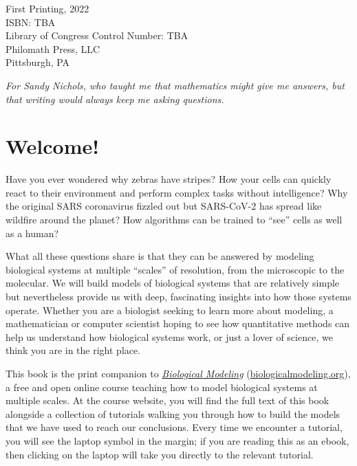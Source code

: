 \noindent First Printing, 2022\\

\noindent ISBN: TBA\\

\noindent Library of Congress Control Number: TBA\\

\noindent Philomath Press, LLC\\
Pittsburgh, PA
\addtocounter{page}{-1}


\begin{dedication}
\textit{For Sandy Nichols, who taught me that mathematics might give me answers, but that writing would always keep me asking questions.}\\[\baselineskip]
\thispagestyle{empty}
\end{dedication}

\newpage
{}

\addtocounter{page}{-1}


\newpage
{}
\chapter{Welcome!}

Have you ever wondered why zebras have stripes? How your cells can quickly react to their environment and perform complex tasks without intelligence? Why the original SARS coronavirus fizzled out but SARS-CoV-2 has spread like wildfire around the planet? How algorithms can be trained to ``see'' cells as well as a human?

What all these questions share is that they can be answered by modeling biological systems at multiple ``scales'' of resolution, from the microscopic to the molecular. We will build models of biological systems that are relatively simple but nevertheless provide us with deep, fascinating insights into how those systems operate. Whether you are a biologist seeking to learn more about modeling, a mathematician or computer scientist hoping to see how quantitative methods can help us understand how biological systems work, or just a lover of science, we think you are in the right place.

This book is the print companion to \href{https://biologicalmodeling.org}{\textit{Biological Modeling}} (\href{https://biologicalmodeling.org}{biologicalmodeling.org}), a free and open online course teaching how to model biological systems at multiple scales. At the course website, you will find the full text of this book alongside a collection of tutorials walking you through how to build the models that we have used to reach our conclusions. Every time we encounter a tutorial, you will see the laptop symbol in the margin; if you are reading this as an ebook, then clicking on the laptop will take you directly to the relevant tutorial.\tutorial[]

